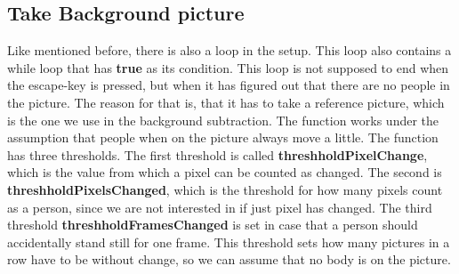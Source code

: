 \subsection{Take Background picture}\label{backgroundConfig}
Like mentioned before, there is also a loop in the setup. This loop also contains a while loop that has \textbf{true} as its condition. This loop is not supposed to end when the escape-key is pressed, but when it has figured out that there are no people in the picture. The reason for that is, that it has to take a reference picture, which is the one we use in the background subtraction. The function works under the assumption that people when on the picture always move a little. The function has three thresholds. The first threshold is called \textbf{threshholdPixelChange}, which is the value from which a pixel can be counted as changed. The second is \textbf{threshholdPixelsChanged}, which is the threshold for how many pixels count as a person, since we are not interested in if just pixel has changed. The third threshold \textbf{threshholdFramesChanged} is set in case that a person should accidentally stand still for one frame. This threshold sets how many pictures in a row have to be without change, so we can assume that no body is on the picture. 
